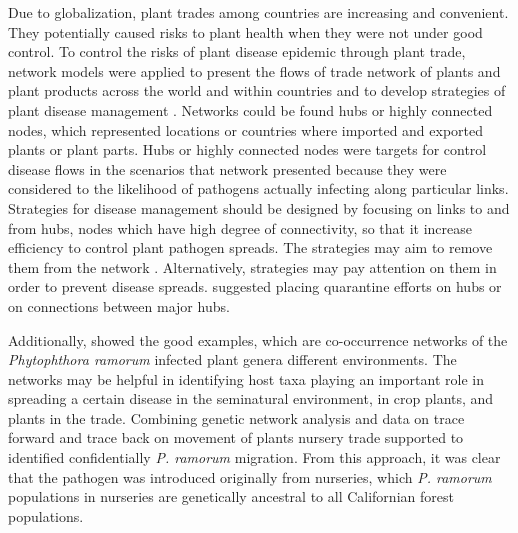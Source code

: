 Due to globalization, plant trades among countries are increasing and convenient. They potentially caused risks to plant health when they were not under good control. To control the risks of plant disease epidemic through plant trade, network models were applied to present the flows of trade network of plants and plant products across the world and within countries and to develop strategies of plant disease management \citep{pautasso2015network}. Networks could be found hubs or highly connected nodes, which represented locations or countries where imported and exported plants or plant parts. Hubs or highly connected nodes were targets for control disease flows in the scenarios that network presented because they were considered to the likelihood of pathogens actually infecting along particular links. Strategies for disease management should be designed by focusing on links to and from hubs, nodes which have high degree of connectivity, so that it increase efficiency to control plant pathogen spreads. The strategies may aim to remove them from the network \citep{Jeger:2007tn, Lefebvre:2011fo}. Alternatively, strategies may pay attention on them in order to prevent disease spreads. \citet{Shaw:2014cka} suggested placing quarantine efforts on hubs or on connections between major hubs.

Additionally, \citet{pautasso2008epidemiological} showed the good examples, which are co-occurrence networks of the \textit{Phytophthora ramorum} infected plant genera different environments. The networks may be helpful in identifying host taxa playing an important role in spreading a certain disease in the seminatural environment, in crop plants, and plants in the trade. Combining genetic network analysis and data on trace forward and trace back on movement of plants nursery trade supported to identified confidentially \textit{P. ramorum} migration. From this approach, it was clear that the pathogen was introduced originally from nurseries, which \textit{P. ramorum} populations in nurseries are genetically ancestral to all Californian forest populations.




